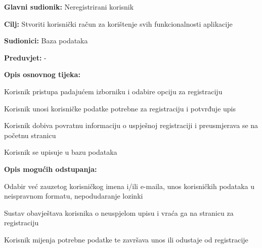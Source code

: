 					\noindent {}
					\begin{packed_item}
						
						\item \textbf{Glavni sudionik: } Neregistrirani korisnik 
						\item  \textbf{Cilj:} Stvoriti korisnički račun za korištenje svih funkcionalnosti aplikacije
						\item  \textbf{Sudionici:} Baza podataka 
						\item  \textbf{Preduvjet:} -
						\item  \textbf{Opis osnovnog tijeka:}
						
						\item[] \begin{packed_enum}
							
							\item Korisnik pristupa padajućem izborniku i odabire opciju za registraciju 
							\item Korisnik unosi korisničke podatke potrebne za registraciju i potvrđuje upis
							\item Korisnik dobiva povratnu informaciju o uspješnoj registraciji i preusmjerava se na početnu stranicu
							\item Korisnik se upisuje u bazu podataka
							
						\end{packed_enum}
						
						\item  \textbf{Opis mogućih odstupanja:}
						
						\item[] \begin{packed_item}
	
							\item[2.a] Odabir već zauzetog korisničkog imena i/ili e-maila, unos korisničkih podataka u neispravnom formatu, nepodudaranje lozinki 
							\item[] \begin{packed_enum}
								
								\item Sustav obavještava korisnika o neuspjelom upisu i vraća ga na stranicu za registraciju 
								\item Korisnik mijenja potrebne podatke te završava unos ili odustaje od registracije
								
							\end{packed_enum}
							
							
						\end{packed_item}
					\end{packed_item}
				
